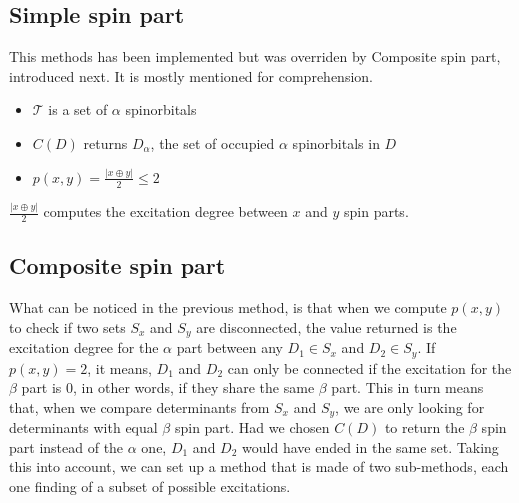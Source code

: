\documentclass[./thesis.tex]{subfiles}
\begin{document}
\subsection{Simple spin part}
This methods has been implemented but was overriden by Composite spin part, introduced next. It is mostly mentioned for comprehension.

\begin{itemize}
	\item
$\mathcal{T}$ is a set of $\alpha$ spinorbitals
	\item
$C(D)$ returns $D_\alpha$, the set of occupied $\alpha$ spinorbitals in $D$
	\item
$p(x, y) = \frac{|x \oplus y|}{2} \leq 2$
\end{itemize}

$\frac{|x \oplus y|}{2}$ computes the excitation degree between $x$ and $y$ spin parts. 
    

    
\subsection{Composite spin part}
What can be noticed in the previous method, is that when we compute $p(x, y)$ to check if two sets $S_x$ and $S_y$ are disconnected, the value returned is the excitation degree for the $\alpha$ part between any $D_1 \in S_x$ and $D_2 \in S_y$. If $p(x, y)=2$, it means, $D_1$ and $D_2$ can only be connected if the excitation for the $\beta$ part is 0, in other words, if they share the same $\beta$ part. This in turn means that, when we compare determinants from $S_x$ and $S_y$, we are only looking for determinants with equal $\beta$ spin part.
Had we chosen $C(D)$ to return the $\beta$ spin part instead of the $\alpha$ one, $D_1$ and $D_2$ would have ended in the same set.
Taking this into account, we can set up a method that is made of two sub-methods, each one finding of a subset of possible excitations.
\end{document}
